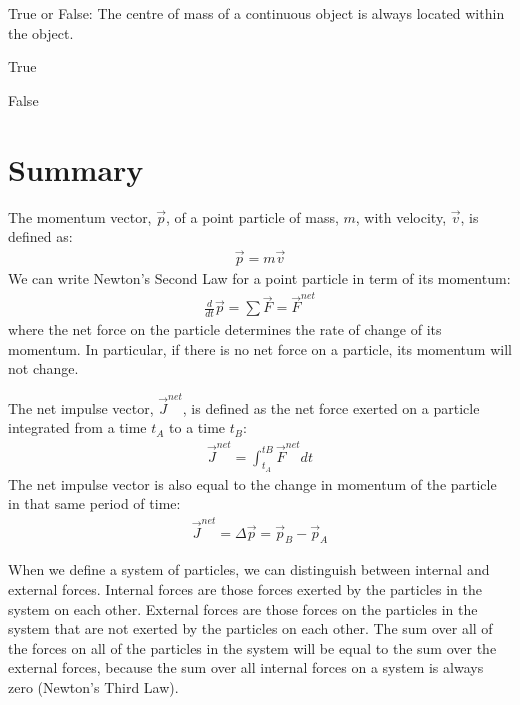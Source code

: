 \begin{checkpoint}
\begin{MCquestion}{True or False: The centre of mass of a continuous object is always located within the object.}
\item True
\item False \correct
\end{MCquestion}
\end{checkpoint}

\newpage
\section{Summary}
\vspace{-0.5cm}
\begin{chapterSummary}{
The momentum vector, $\vec p$, of a point particle of mass, $m$, with velocity, $\vec v$, is defined as:
\begin{align*}
\vec p = m\vec v
\end{align*}
We can write Newton's Second Law for a point particle in term of its momentum:
\begin{align*}
\frac{d}{dt}\vec p = \sum \vec F = \vec F^{net}
\end{align*}
where the net force on the particle determines the rate of change of its momentum. In particular, if there is no net force on a particle, its momentum will not change.

The net impulse vector, $\vec J^{net}$, is defined as the net force exerted on a particle integrated from a time $t_A$ to a time $t_B$:
\begin{align*}
\vec J^{net} = \int_{t_A}^{tB} \vec F^{net} dt
\end{align*}
The net impulse vector is also equal to the change in momentum of the particle in that same period of time:
\begin{align*}
\vec J^{net} = \Delta \vec p = \vec p_B - \vec p_A
\end{align*}

When we define a system of particles, we can distinguish between internal and external forces. Internal forces are those forces exerted by the particles in the system on each other. External forces are those forces on the particles in the system that are not exerted by the particles on each other. The sum over all of the forces on all of the particles in the system will be equal to the sum over the external forces, because the sum over all internal forces on a system is always zero (Newton's Third Law).

}
\end{chapterSummary}
